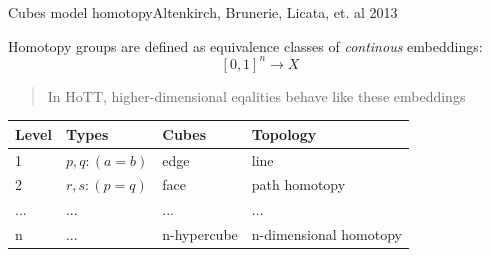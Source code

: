 \documentclass[english,draft]{beamer}
\begin{document}
\begin{frame}{Cubes model homotopy}{Altenkirch, Brunerie, Licata, et. al 2013}
 
Homotopy groups are defined as equivalence classes of \emph{continous} embeddings:
$$[0,1]^n \rightarrow X$$

\begin{quotation}
In HoTT, higher-dimensional eqalities behave like these embeddings
\end{quotation}
\pause

    \begin{table}[]
        \begin{tabular}{@{}llll@{}}
        \toprule
        Level                & Types                & Cubes                 & Topology               \\ \midrule
        1                    & $p,q : (a = b)$        & edge                  & line                   \\
        2                    & $r,s : (p = q)$        & face                  & path homotopy          \\
        ... & ... & ... & ...   \\
        n                    & ... & n-hypercube           & n-dimensional homotopy \\ \bottomrule
        \end{tabular}
    \end{table}

%  
\end{frame}
\end{document}

